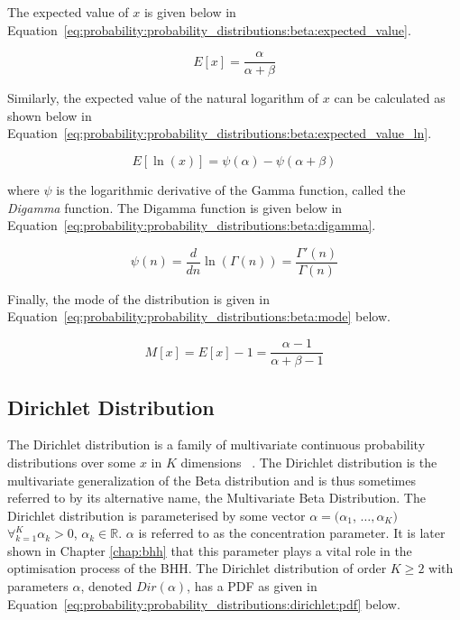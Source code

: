 The expected value of $x$ is given below in Equation~\eqref{eq:probability:probability_distributions:beta:expected_value}.

\begin{equation}
      \label{eq:probability:probability_distributions:beta:expected_value}
      E[x] = \frac{\alpha}{\alpha + \beta}
\end{equation}

Similarly, the expected value of the natural logarithm of $x$ can be calculated as shown below in Equation~\eqref{eq:probability:probability_distributions:beta:expected_value_ln}.

\begin{equation}
      \label{eq:probability:probability_distributions:beta:expected_value_ln}
      E[\ln(x)] = \psi({\alpha}) - \psi(\alpha + \beta)
\end{equation}

where $\psi$ is the logarithmic derivative of the Gamma function, called the \textit{Digamma} function. The Digamma function is given below in Equation~\eqref{eq:probability:probability_distributions:beta:digamma}.

\begin{equation}
      \label{eq:probability:probability_distributions:beta:digamma}
      \psi(n) = \frac{d}{dn}\ln(\Gamma(n)) = \frac{\Gamma'(n)}{\Gamma(n)}
\end{equation}

Finally, the mode of the distribution is given in Equation~\eqref{eq:probability:probability_distributions:beta:mode} below.

\begin{equation}
      \label{eq:probability:probability_distributions:beta:mode}
      M[x] = E[x] - 1 = \frac{\alpha - 1}{\alpha + \beta - 1}
\end{equation}










\subsection{Dirichlet Distribution}
\label{sec:probability:probability_distributions:dirichlet}


The Dirichlet distribution is a family of multivariate continuous probability distributions over some $x$ in $K$ dimensions ~\cite{ref:wackerly:2014}. The Dirichlet distribution is the multivariate generalization of the Beta distribution and is thus sometimes referred to by its alternative name, the Multivariate Beta Distribution. The Dirichlet distribution is parameterised by some vector $\alpha = (\alpha_{1}$,  $\dots, \alpha_{K})$ $\forall_{k=1}^{K} \alpha_{k} > 0$, $\alpha_{k} \in \mathbb{R}$. $\alpha$ is referred to as the concentration parameter. It is later shown in Chapter \ref{chap:bhh} that this parameter plays a vital role in the optimisation process of the \ac{BHH}. The Dirichlet distribution of order $K \geq 2$ with parameters $\alpha$, denoted $Dir(\alpha)$, has a \ac{PDF} as given in Equation~\eqref{eq:probability:probability_distributions:dirichlet:pdf} below.

